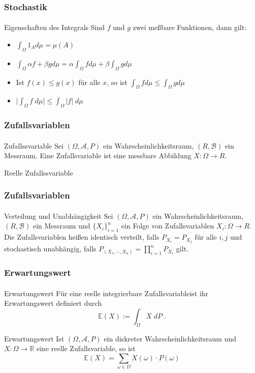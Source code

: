 \documentclass{beamer}
\begin{document}
\begin{frame}
    \frametitle{Stochastik}
\framesubtitle{}
\begin{block}{Eigenschaften des Integrals}
    Sind $f$ und $g$ zwei meßbare Funktionen, dann gilt:
    \begin{itemize}
        \item $\int_{\Omega} 1_A  d\mu  = \mu (A)$  
    \item $\int_{\Omega} \alpha f  + \beta g d\mu = \alpha \int_{\Omega}  f d\mu + \beta  \int_{\Omega}  g d\mu$
    \item Ist $f(x) \leq g(x)$ für alle $x$, so ist $\int_{\Omega} f d\mu \leq \int_{\Omega} g d\mu$ 
    \item $ \biggl | \int_{\Omega} f \; d\mu \biggr | \leq \int_{\Omega} |f| \; d\mu $
    \end{itemize}
    \end{block}
\end{frame}




\begin{frame}
    \frametitle{Zufallsvariablen}
\framesubtitle{}
\begin{block}{Zufallssvariable}
    Sei $(\Omega, \mathcal{A}, P)$ ein Wahrscheinlichkeitsraum, $(R, \mathcal{B})$ ein Messraum.
    Eine  Zufallsvariable ist eine messbare Abbildung  $X :  \Omega \to R$.
\end{block}
\begin{block}{Reelle Zufallssvariable}
\end{block} 
\end{frame}



\begin{frame}
    \frametitle{Zufallsvariablen}
\framesubtitle{}
\begin{block}{Verteilung und Unabhängigkeit}
Sei $(\Omega, \mathcal{A}, P)$ ein Wahrscheinlichkeitsraum, $(R, \mathcal{B})$ ein Messraum  und
 $\{X_i\}_{i=1}^n$ ein Folge von Zufallsvariablen   $X_i :  \Omega \to R$.
Die Zufallsvariablen heißen identisch verteilt, falls
 $P_{X_i} = P_{X_j}$ für alle $i,j$  und
stochastisch unabhängig, falls
 $P_{(X_1, \cdots ,X_n)} = \prod_{i=1}^n P_{X_i}$ gilt. 
\end{block}
 \end{frame}



\begin{frame}
    \frametitle{Erwartungswert}
\framesubtitle{}
\begin{block}{Erwartungswert}
Für eine reelle integrierbare Zufallsvariableist ihr  Erwartungswert  definiert durch
$$ \mathbb{E} (X) := \int_{\Omega} X \; dP \; .$$
\end{block}
 \begin{block}{Erwartungswert}
Ist $(\Omega, \mathcal{A}, P)$ ein diskreter Wahrscheinlichkeitsraum und $X :\Omega \to \mathbb{R}$ eine reelle Zufallsvariable, so ist
$$ \mathbb{E} (X) = \sum_{\omega \in \Omega}  X(\omega) \cdot P(\omega)$$
\end{block}
 \end{frame}
\end{document}
